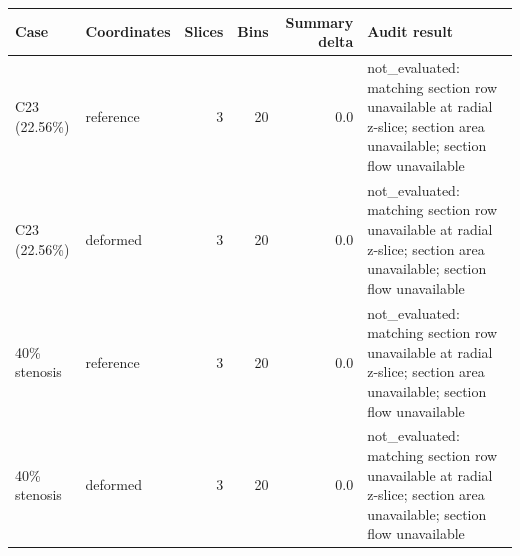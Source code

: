 \begin{tabular}{@{}llrrrl@{}}
\toprule
Case & Coordinates & Slices & Bins & Summary delta & Audit result \\
\midrule
C23 (22.56\%) & reference & 3 & 20 & 0.0 & not_evaluated: matching section row unavailable at radial z-slice; section area unavailable; section flow unavailable \\
C23 (22.56\%) & deformed & 3 & 20 & 0.0 & not_evaluated: matching section row unavailable at radial z-slice; section area unavailable; section flow unavailable \\
40\% stenosis & reference & 3 & 20 & 0.0 & not_evaluated: matching section row unavailable at radial z-slice; section area unavailable; section flow unavailable \\
40\% stenosis & deformed & 3 & 20 & 0.0 & not_evaluated: matching section row unavailable at radial z-slice; section area unavailable; section flow unavailable \\
\bottomrule
\end{tabular}
